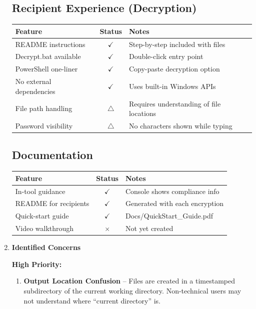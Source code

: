 \documentclass[11pt,letterpaper]{article}
\newcommand{\dmsection}[1]{\item \textbf{#1}\par}
\begin{document}
\begin{enumerate}
\subsection*{Recipient Experience (Decryption)}

\begin{tabularx}{\textwidth}{|l|c|X|}
\hline
\textbf{Feature} & \textbf{Status} & \textbf{Notes} \\
\hline
README instructions & \textcolor{passgreen}{$\checkmark$} & Step-by-step included with files \\
\hline
Decrypt.bat available & \textcolor{passgreen}{$\checkmark$} & Double-click entry point \\
\hline
PowerShell one-liner & \textcolor{passgreen}{$\checkmark$} & Copy-paste decryption option \\
\hline
No external dependencies & \textcolor{passgreen}{$\checkmark$} & Uses built-in Windows APIs \\
\hline
File path handling & \textcolor{warncolor}{$\triangle$} & Requires understanding of file locations \\
\hline
Password visibility & \textcolor{warncolor}{$\triangle$} & No characters shown while typing \\
\hline
\end{tabularx}

\subsection*{Documentation}

\begin{tabularx}{\textwidth}{|l|c|X|}
\hline
\textbf{Feature} & \textbf{Status} & \textbf{Notes} \\
\hline
In-tool guidance & \textcolor{passgreen}{$\checkmark$} & Console shows compliance info \\
\hline
README for recipients & \textcolor{passgreen}{$\checkmark$} & Generated with each encryption \\
\hline
Quick-start guide & \textcolor{passgreen}{$\checkmark$} & Docs/QuickStart\_Guide.pdf \\
\hline
Video walkthrough & \textcolor{failred}{$\times$} & Not yet created \\
\hline
\end{tabularx}

\dmsection{Identified Concerns}

\textbf{High Priority:}
\begin{enumerate}
    \item \textbf{Output Location Confusion} -- Files are created in a timestamped subdirectory of the current working directory. Non-technical users may not understand where ``current directory'' is.


\end{enumerate}
\end{enumerate}
\end{document}
